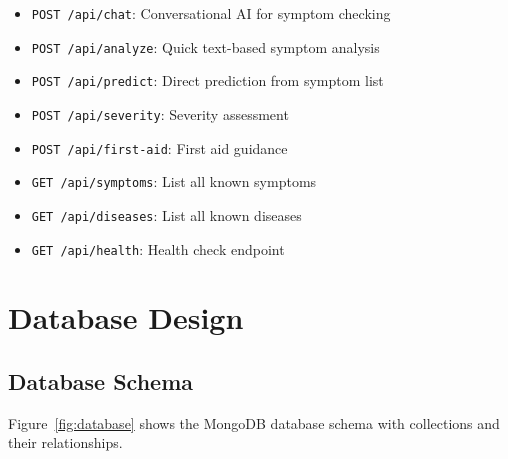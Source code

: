 \documentclass[12pt,a4paper]{article}
\begin{document}
\begin{itemize}
    \item \texttt{POST /api/chat}: Conversational AI for symptom checking
    \item \texttt{POST /api/analyze}: Quick text-based symptom analysis
    \item \texttt{POST /api/predict}: Direct prediction from symptom list
    \item \texttt{POST /api/severity}: Severity assessment
    \item \texttt{POST /api/first-aid}: First aid guidance
    \item \texttt{GET /api/symptoms}: List all known symptoms
    \item \texttt{GET /api/diseases}: List all known diseases
    \item \texttt{GET /api/health}: Health check endpoint
\end{itemize}

\section{Database Design}

\subsection{Database Schema}
Figure~\ref{fig:database} shows the MongoDB database schema with collections and their relationships.
\end{document}
